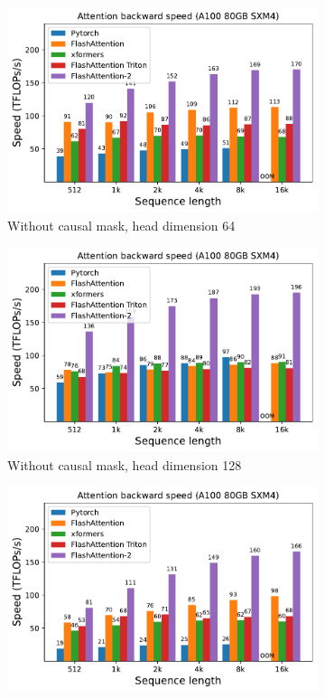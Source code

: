 \begin{figure}[ht]
  \centering
  \begin{subfigure}{.5\textwidth}
    \centering
    \includegraphics[width=.95\linewidth]{figs/flash2_causal_False_hdim_64_bwd_speed.pdf}
    \caption{Without causal mask, head dimension 64}
  \end{subfigure}%
  \begin{subfigure}{.5\textwidth}
    \centering
    \includegraphics[width=.95\linewidth]{figs/flash2_causal_False_hdim_128_bwd_speed.pdf}
    \caption{Without causal mask, head dimension 128}
  \end{subfigure}
  \begin{subfigure}{.5\textwidth}
    \centering
    \includegraphics[width=.95\linewidth]{figs/flash2_causal_True_hdim_64_bwd_speed.pdf}

\end{subfigure}
\end{figure}
